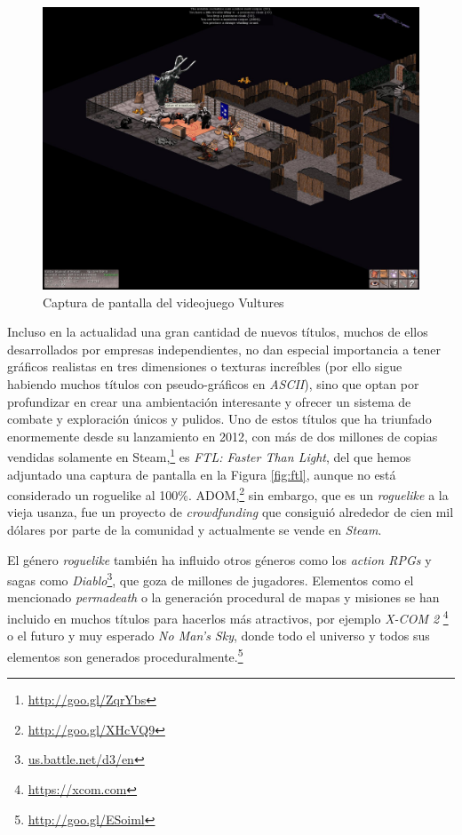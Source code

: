 \begin{figure}[h!]
		\includegraphics[width=\textwidth,height=\textheight,keepaspectratio]{./img/Vultures.jpg}
	\caption{Captura de pantalla del videojuego Vultures}
	\label{fig:vulturesgame}
\end{figure}

Incluso en la actualidad una gran cantidad de nuevos títulos, muchos de ellos desarrollados por empresas independientes, no dan especial importancia a tener gráficos realistas en tres dimensiones o texturas increíbles (por ello sigue habiendo muchos títulos con pseudo-gráficos en \textit{ASCII}), sino que optan por profundizar en crear una ambientación interesante y ofrecer un sistema de combate y exploración únicos y pulidos.
Uno de estos títulos que ha triunfado enormemente desde su lanzamiento en 2012, con más de dos millones de copias vendidas solamente en Steam,\footnote{\url{http://goo.gl/ZqrYbs}} es \textit{FTL: Faster Than Light}, del que hemos adjuntado una captura de pantalla en la Figura \ref{fig:ftl}, aunque no está considerado un roguelike al 100\%. ADOM,\footnote{\url{http://goo.gl/XHcVQ9}} sin embargo, que es un \textit{roguelike} a la vieja usanza, fue un proyecto de \textit{crowdfunding} que consiguió alrededor de cien mil dólares por parte de la comunidad y actualmente se vende en \textit{Steam}.

El género \textit{roguelike} también ha influido otros géneros como los \textit{action RPGs} y sagas como \textit{Diablo}\footnote{\url{us.battle.net/d3/en}}, que goza de millones de jugadores.
Elementos como el mencionado \textit{permadeath} o la generación procedural de mapas y misiones se han incluido en muchos títulos para hacerlos más atractivos, por ejemplo \textit{X-COM 2} \footnote{\url{https://xcom.com}} o el futuro y muy esperado \textit{No Man's Sky}, donde todo el universo y todos sus elementos son generados proceduralmente.\footnote{\url{http://goo.gl/ESoiml}}

